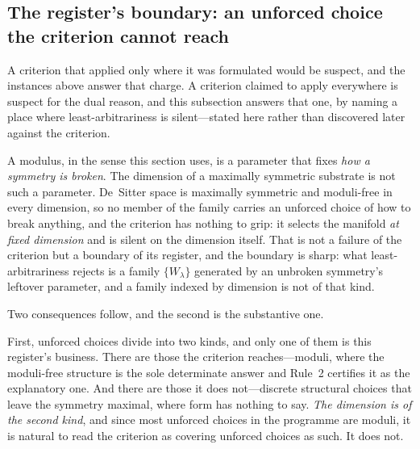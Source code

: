 \documentclass[11pt,a4paper]{article}
\begin{document}
\subsection{The register's boundary: an unforced choice the criterion cannot reach}\label{sec:register-boundary}

A criterion that applied only where it was formulated would be suspect, and the instances above answer that
charge. A criterion claimed to apply everywhere is suspect for the dual reason, and this subsection answers
that one, by naming a place where least-arbitrariness is silent---stated here rather than discovered later
against the criterion.

A modulus, in the sense this section uses, is a parameter that fixes \emph{how a symmetry is broken}. The
dimension of a maximally symmetric substrate is not such a parameter. De~Sitter space is maximally symmetric
and moduli-free in every dimension, so no member of the family carries an unforced choice of how to break
anything, and the criterion has nothing to grip: it selects the manifold \emph{at fixed dimension} and is
silent on the dimension itself. That is not a failure of the criterion but a boundary of its register, and the
boundary is sharp: what least-arbitrariness rejects is a family $\{W_\lambda\}$ generated by an unbroken
symmetry's leftover parameter, and a family indexed by dimension is not of that kind.

Two consequences follow, and the second is the substantive one.

First, unforced choices divide into two kinds, and only one of them is this register's business. There are
those the criterion reaches---moduli, where the moduli-free structure is the sole determinate answer and Rule~2
certifies it as the explanatory one. And there are those it does not---discrete structural choices that leave
the symmetry maximal, where form has nothing to say. \emph{The dimension is of the second kind}, and since
most unforced choices in the programme are moduli, it is natural to read the criterion as covering unforced
choices as such. It does not.
\end{document}
